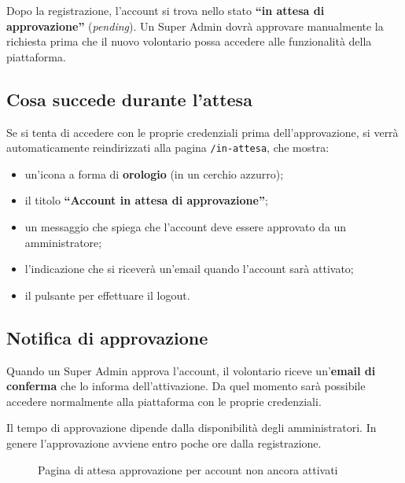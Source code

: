 \documentclass[a4paper,11pt,oneside]{book}
\newcommand{\pulsante}[1]{\fcolorbox{namoCharcoal}{namoGray}{\small\textsf{\textbf{#1}}}}
\newcommand{\percorso}[1]{\textcolor{namoCyan}{\texttt{#1}}}
\begin{document}
Dopo la registrazione, l'account si trova nello stato \textbf{``in attesa di approvazione''} (\textit{pending}). Un Super Admin dovr\`a approvare manualmente la richiesta prima che il nuovo volontario possa accedere alle funzionalit\`a della piattaforma.

\subsection{Cosa succede durante l'attesa}

Se si tenta di accedere con le proprie credenziali prima dell'approvazione, si verr\`a automaticamente reindirizzati alla pagina \percorso{/in-attesa}, che mostra:

\begin{itemize}[leftmargin=1.5em]
  \item un'icona a forma di \textbf{orologio} (in un cerchio azzurro);
  \item il titolo \textbf{``Account in attesa di approvazione''};
  \item un messaggio che spiega che l'account deve essere approvato da un amministratore;
  \item l'indicazione che si ricever\`a un'email quando l'account sar\`a attivato;
  \item il pulsante \pulsante{Esci} per effettuare il logout.
\end{itemize}

\subsection{Notifica di approvazione}

Quando un Super Admin approva l'account, il volontario riceve un'\textbf{email di conferma} che lo informa dell'attivazione. Da quel momento sar\`a possibile accedere normalmente alla piattaforma con le proprie credenziali.

\begin{infobox}
Il tempo di approvazione dipende dalla disponibilit\`a degli amministratori. In genere l'approvazione avviene entro poche ore dalla registrazione.
\end{infobox}

\begin{figure}[htbp]
\centering
{}
\caption{Pagina di attesa approvazione per account non ancora attivati}
\label{fig:pending-approval}
\end{figure}
\end{document}
